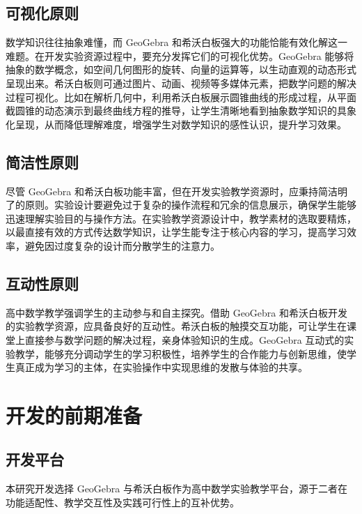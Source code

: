 \subsection{可视化原则}

数学知识往往抽象难懂，而 GeoGebra 和希沃白板强大的功能恰能有效化解这一难题。在开发实验资源过程中，要充分发挥它们的可视化优势。GeoGebra 能够将抽象的数学概念，如空间几何图形的旋转、向量的运算等，以生动直观的动态形式呈现出来。希沃白板则可通过图片、动画、视频等多媒体元素，把数学问题的解决过程可视化。比如在解析几何中，利用希沃白板展示圆锥曲线的形成过程，从平面截圆锥的动态演示到最终曲线方程的推导，让学生清晰地看到抽象数学知识的具象化呈现，从而降低理解难度，增强学生对数学知识的感性认识，提升学习效果。


\subsection{简洁性原则}
尽管 GeoGebra 和希沃白板功能丰富，但在开发实验教学资源时，应秉持简洁明了的原则。实验设计要避免过于复杂的操作流程和冗余的信息展示，确保学生能够迅速理解实验目的与操作方法。在实验教学资源设计中，教学素材的选取要精炼，以最直接有效的方式传达数学知识，让学生能专注于核心内容的学习，提高学习效率，避免因过度复杂的设计而分散学生的注意力。

\subsection{互动性原则}
高中数学教学强调学生的主动参与和自主探究。借助 GeoGebra 和希沃白板开发的实验教学资源，应具备良好的互动性。希沃白板的触摸交互功能，可让学生在课堂上直接参与数学问题的解决过程，亲身体验知识的生成。GeoGebra 互动式的实验教学，能够充分调动学生的学习积极性，培养学生的合作能力与创新思维，使学生真正成为学习的主体，在实验操作中实现思维的发散与体验的共享。


\section{开发的前期准备}
\subsection{开发平台}
本研究开发选择 GeoGebra 与希沃白板作为高中数学实验教学平台，源于二者在功能适配性、教学交互性及实践可行性上的互补优势。

